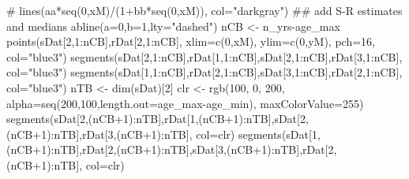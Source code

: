 \documentclass[
  11pt,
]{article}
\newenvironment{Shaded}{}{}
\newcommand{\CommentTok}[1]{\textcolor[rgb]{0.00,0.50,0.00}{#1}}
\newcommand{\DataTypeTok}[1]{#1}
\newcommand{\DecValTok}[1]{#1}
\newcommand{\KeywordTok}[1]{\textcolor[rgb]{0.00,0.00,1.00}{#1}}
\newcommand{\NormalTok}[1]{#1}
\newcommand{\OperatorTok}[1]{#1}
\newcommand{\StringTok}[1]{\textcolor[rgb]{0.00,0.50,0.50}{#1}}
\begin{document}
\begin{Shaded}
\begin{Highlighting}[]
\CommentTok{# lines(aa*seq(0,xM)/(1+bb*seq(0,xM)), col="darkgray")}
\CommentTok{## add S-R estimates and medians}
\KeywordTok{abline}\NormalTok{(}\DataTypeTok{a=}\DecValTok{0}\NormalTok{,}\DataTypeTok{b=}\DecValTok{1}\NormalTok{,}\DataTypeTok{lty=}\StringTok{"dashed"}\NormalTok{)}
\NormalTok{nCB <-}\StringTok{ }\NormalTok{n_yrs}\OperatorTok{-}\NormalTok{age_max}
\KeywordTok{points}\NormalTok{(sDat[}\DecValTok{2}\NormalTok{,}\DecValTok{1}\OperatorTok{:}\NormalTok{nCB],rDat[}\DecValTok{2}\NormalTok{,}\DecValTok{1}\OperatorTok{:}\NormalTok{nCB], }\DataTypeTok{xlim=}\KeywordTok{c}\NormalTok{(}\DecValTok{0}\NormalTok{,xM), }\DataTypeTok{ylim=}\KeywordTok{c}\NormalTok{(}\DecValTok{0}\NormalTok{,yM), }\DataTypeTok{pch=}\DecValTok{16}\NormalTok{, }\DataTypeTok{col=}\StringTok{"blue3"}\NormalTok{)}
\KeywordTok{segments}\NormalTok{(sDat[}\DecValTok{2}\NormalTok{,}\DecValTok{1}\OperatorTok{:}\NormalTok{nCB],rDat[}\DecValTok{1}\NormalTok{,}\DecValTok{1}\OperatorTok{:}\NormalTok{nCB],sDat[}\DecValTok{2}\NormalTok{,}\DecValTok{1}\OperatorTok{:}\NormalTok{nCB],rDat[}\DecValTok{3}\NormalTok{,}\DecValTok{1}\OperatorTok{:}\NormalTok{nCB], }\DataTypeTok{col=}\StringTok{"blue3"}\NormalTok{)}
\KeywordTok{segments}\NormalTok{(sDat[}\DecValTok{1}\NormalTok{,}\DecValTok{1}\OperatorTok{:}\NormalTok{nCB],rDat[}\DecValTok{2}\NormalTok{,}\DecValTok{1}\OperatorTok{:}\NormalTok{nCB],sDat[}\DecValTok{3}\NormalTok{,}\DecValTok{1}\OperatorTok{:}\NormalTok{nCB],rDat[}\DecValTok{2}\NormalTok{,}\DecValTok{1}\OperatorTok{:}\NormalTok{nCB], }\DataTypeTok{col=}\StringTok{"blue3"}\NormalTok{)}
\NormalTok{nTB <-}\StringTok{ }\KeywordTok{dim}\NormalTok{(sDat)[}\DecValTok{2}\NormalTok{]}
\NormalTok{clr <-}\StringTok{ }\KeywordTok{rgb}\NormalTok{(}\DecValTok{100}\NormalTok{, }\DecValTok{0}\NormalTok{, }\DecValTok{200}\NormalTok{, }\DataTypeTok{alpha=}\KeywordTok{seq}\NormalTok{(}\DecValTok{200}\NormalTok{,}\DecValTok{100}\NormalTok{,}\DataTypeTok{length.out=}\NormalTok{age_max}\OperatorTok{-}\NormalTok{age_min), }\DataTypeTok{maxColorValue=}\DecValTok{255}\NormalTok{)}
\KeywordTok{segments}\NormalTok{(sDat[}\DecValTok{2}\NormalTok{,(nCB}\OperatorTok{+}\DecValTok{1}\NormalTok{)}\OperatorTok{:}\NormalTok{nTB],rDat[}\DecValTok{1}\NormalTok{,(nCB}\OperatorTok{+}\DecValTok{1}\NormalTok{)}\OperatorTok{:}\NormalTok{nTB],sDat[}\DecValTok{2}\NormalTok{,(nCB}\OperatorTok{+}\DecValTok{1}\NormalTok{)}\OperatorTok{:}\NormalTok{nTB],rDat[}\DecValTok{3}\NormalTok{,(nCB}\OperatorTok{+}\DecValTok{1}\NormalTok{)}\OperatorTok{:}\NormalTok{nTB], }\DataTypeTok{col=}\NormalTok{clr)}
\KeywordTok{segments}\NormalTok{(sDat[}\DecValTok{1}\NormalTok{,(nCB}\OperatorTok{+}\DecValTok{1}\NormalTok{)}\OperatorTok{:}\NormalTok{nTB],rDat[}\DecValTok{2}\NormalTok{,(nCB}\OperatorTok{+}\DecValTok{1}\NormalTok{)}\OperatorTok{:}\NormalTok{nTB],sDat[}\DecValTok{3}\NormalTok{,(nCB}\OperatorTok{+}\DecValTok{1}\NormalTok{)}\OperatorTok{:}\NormalTok{nTB],rDat[}\DecValTok{2}\NormalTok{,(nCB}\OperatorTok{+}\DecValTok{1}\NormalTok{)}\OperatorTok{:}\NormalTok{nTB], }\DataTypeTok{col=}\NormalTok{clr)}

\end{Highlighting}
\end{Shaded}
\end{document}
